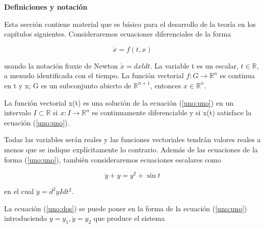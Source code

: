 \documentclass{beamer}
\begin{document}
\begin{frame}

\textbf{Definiciones y notación}

\justify

\hfill

Esta sección contiene material que es básico para el desarrollo de la teoría en los capítulos siguientes. Consideraremos ecuaciones diferenciales de la forma

\begin{equation} \label{uno:uno}
\dot{x} = f(t,x)
\end{equation}

usando la notación fiuxie de Newton $\dot{x} = dxldt$. La variable t es un escalar, $t \in \mathbb{R}$, a menudo identificada con el tiempo. La función vectorial $f: G \rightarrow \mathbb{R}^n$ es continua en t y x; G es un subconjunto abierto de $\mathbb{R}^{n+1}$, entonces $ x\in \mathbb{R}^n$.

\end{frame}


\begin{frame}

La función vectorial x(t) es una solución de la ecuación (\ref{uno:uno}) en un intervalo $I \subset \mathbb{R}$ si $x: I \rightarrow \mathbb{R}^n$ es continuamente diferenciable y si x(t) satisface la ecuación (\ref{uno:uno}).

Todas las variables serán reales y las funciones vectoriales tendrán valores reales a menos que se indique explícitamente lo contrario. Además de las ecuaciones de la forma (\ref{uno:uno}), también consideraremos ecuaciones escalares como

\begin{equation} \label{uno:dos}
\ddot{y} + y = y^2 + \sin t 
\end{equation}

en el cual $\ddot{y} = d^2y I dt^2$.

La ecuación (\ref{uno:dos}) se puede poner en la forma de la ecuación (\ref{uno:uno}) introduciendo $y = y_1, \dot{y} = y_2$ que produce el sistema


\end{frame}
\end{document}
